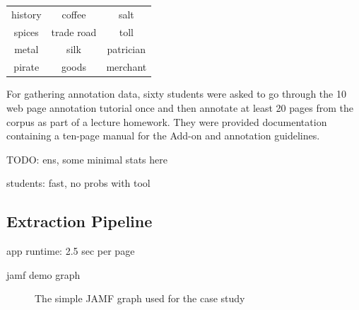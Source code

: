 \begin{table}
\label{t:seed}
\centering
{}
\begin{tabular}[h]{ccc}
        history
&        coffee 
&        salt \\
        spices 
&        trade road
&        toll \\
        metal
&        silk 
&        patrician \\
        pirate 
&        goods
&        merchant 
\end{tabular}
\end{table}

For gathering annotation data, sixty students were asked to go through the 10 web page annotation tutorial once and then annotate at least 20 pages from the corpus as part of a lecture homework.
They were provided documentation containing a ten-page manual for the Add-on and annotation guidelines.

TODO: ens, some minimal stats here

students: fast, no probs with tool

\subsection{Extraction Pipeline}

app runtime: 2.5 sec per page

jamf demo graph

\begin{figure}[h]
\centering
{}
\label{f:jamfgraph}
\caption{The simple JAMF graph used for the case study}
\end{figure}

